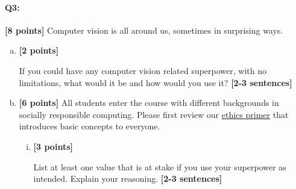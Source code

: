 \documentclass[11pt]{article}
\begin{document}

\pagebreak

\paragraph{Q3:} \textbf{[8 points]} Computer vision is all around us, sometimes in surprising ways.

\begin{enumerate}[(a)]
    \item \textbf{[2 points]} 
    \begin{tcolorbox}[colback=orange!5!white,colframe=orange!75!black]
    If you could have any computer vision related superpower, with no limitations, what would it be and how would you use it? \textbf{[2-3 sentences]}
    \end{tcolorbox}




    \item \textbf{[6 points]}
All students enter the course with different backgrounds in socially responsible computing. Please first review our \href{https://browncsci1430.github.io/webpage/resources/ethics_primer/}{ethics primer} that introduces basic concepts to everyone.

    \begin{enumerate}[(i)]
    \item \textbf{[3 points]}
    \begin{tcolorbox}[colback=orange!5!white,colframe=orange!75!black]
    
    List at least one value that is at stake if you use your superpower as intended. Explain your reasoning. \textbf{[2-3 sentences]}
    \end{tcolorbox}
    
\end{enumerate}
\end{enumerate}
\end{document}
